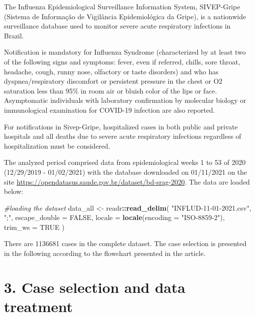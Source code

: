 \documentclass[
]{article}
\newenvironment{Shaded}{\begin{snugshade}}{\end{snugshade}}
\newcommand{\CommentTok}[1]{\textcolor[rgb]{0.56,0.35,0.01}{\textit{#1}}}
\newcommand{\DataTypeTok}[1]{\textcolor[rgb]{0.13,0.29,0.53}{#1}}
\newcommand{\KeywordTok}[1]{\textcolor[rgb]{0.13,0.29,0.53}{\textbf{#1}}}
\newcommand{\NormalTok}[1]{#1}
\newcommand{\OperatorTok}[1]{\textcolor[rgb]{0.81,0.36,0.00}{\textbf{#1}}}
\newcommand{\OtherTok}[1]{\textcolor[rgb]{0.56,0.35,0.01}{#1}}
\newcommand{\StringTok}[1]{\textcolor[rgb]{0.31,0.60,0.02}{#1}}
\begin{document}
The Influenza Epidemiological Surveillance Information System,
SIVEP-Gripe (Sistema de Informação de Vigilância Epidemiológica da
Gripe), is a nationwide surveillance database used to monitor severe
acute respiratory infections in Brazil.

Notification is mandatory for Influenza Syndrome (characterized by at
least two of the following signs and symptoms: fever, even if referred,
chills, sore throat, headache, cough, runny nose, olfactory or taste
disorders) and who has dyspnea/respiratory discomfort or persistent
pressure in the chest or O2 saturation less than 95\% in room air or
bluish color of the lips or face. Asymptomatic individuals with
laboratory confirmation by molecular biology or immunological
examination for COVID-19 infection are also reported.

For notifications in Sivep-Gripe, hospitalized cases in both public and
private hospitals and all deaths due to severe acute respiratory
infections regardless of hospitalization must be considered.

The analyzed period comprised data from epidemiological weeks 1 to 53 of
2020 (12/29/2019 - 01/02/2021) with the database downloaded on
01/11/2021 on the site
\url{https://opendatasus.saude.gov.br/dataset/bd-srag-2020}. The data
are loaded below:

\begin{Shaded}
\begin{Highlighting}[]
\CommentTok{#loading the dataset}
\NormalTok{data_all <-}\StringTok{ }\NormalTok{readr}\OperatorTok{::}\KeywordTok{read_delim}\NormalTok{(}
  \StringTok{"INFLUD-11-01-2021.csv"}\NormalTok{,}
  \StringTok{";"}\NormalTok{,}
  \DataTypeTok{escape_double =} \OtherTok{FALSE}\NormalTok{,}
  \DataTypeTok{locale =} \KeywordTok{locale}\NormalTok{(}\DataTypeTok{encoding =} \StringTok{"ISO-8859-2"}\NormalTok{),}
  \DataTypeTok{trim_ws =} \OtherTok{TRUE}
\NormalTok{)}
\end{Highlighting}
\end{Shaded}

There are 1136681 cases in the complete dataset. The case selection is
presented in the following according to the flowchart presented in the
article.

\hypertarget{case-selection-and-data-treatment}{%
\section{3. Case selection and data
treatment}\label{case-selection-and-data-treatment}}
\end{document}

